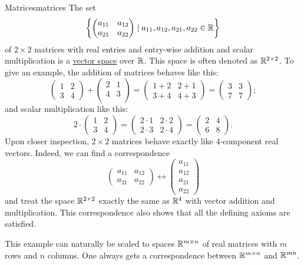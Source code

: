 \begin{example}{Matrices}{matrices}
 The set
 \[
  \left\{
   \begin{pmatrix}
    a_{11} & a_{12}\\
    a_{21} & a_{22}
   \end{pmatrix}
   \mid a_{11},a_{12},a_{21},a_{22} \in \mathbb{R}
  \right\}
 \]
 of $2 \times 2$ matrices with real entries and entry-wise addition and
 scalar multiplication is a \hyperref[def:abstract-vector-space]{vector space}
 over $\mathbb{R}$. This space is often denoted as $\mathbb{R}^{2 \times 2}$. To give an
 example, the addition of matrices behaves like this:
 \[
  \begin{pmatrix}
   1 & 2\\
   3 & 4
  \end{pmatrix}
  + 
  \begin{pmatrix}
   2 & 1\\
   4 & 3\\
  \end{pmatrix}
  = 
  \begin{pmatrix}
   1 + 2 & 2 + 1\\
   3 + 4 & 4 + 3
  \end{pmatrix}
  =
  \begin{pmatrix}
   3 & 3\\
   7 & 7
  \end{pmatrix};
 \]
 and scalar multiplication like this:
 \[
  2 \cdot 
  \begin{pmatrix}
   1 & 2\\
   3 & 4
  \end{pmatrix}
  =
  \begin{pmatrix}
   2 \cdot 1 & 2 \cdot 2\\
   2 \cdot 3 & 2 \cdot 4
  \end{pmatrix}
  = 
  \begin{pmatrix}
   2 & 4\\
   6 & 8
  \end{pmatrix}.
 \]
 Upon closer inspection, $2 \times 2$ matrices behave exactly like $4$-component
 real vectors. Indeed, we can find a correspondence
 \[
  \begin{pmatrix}
   a_{11} & a_{12}\\
   a_{21} & a_{22}
  \end{pmatrix}
  \longleftrightarrow
  \begin{pmatrix}
   a_{11}\\
   a_{12}\\
   a_{21}\\
   a_{22}
  \end{pmatrix}
 \]
 and treat the space $\mathbb{R}^{2 \times 2}$ exactly the same as $\mathbb{R}^{4}$ with vector
 addition and multiplication. This correspondence also shows that all the
 defining axioms are satisfied.

 This example can naturally be scaled to spaces $\mathbb{R}^{m \times n}$ of real
 matrices with $m$ rows and $n$ columns. One always gets a correspondence
 between $\mathbb{R}^{m \times n}$ and $\mathbb{R}^{mn}$.
\end{example}

